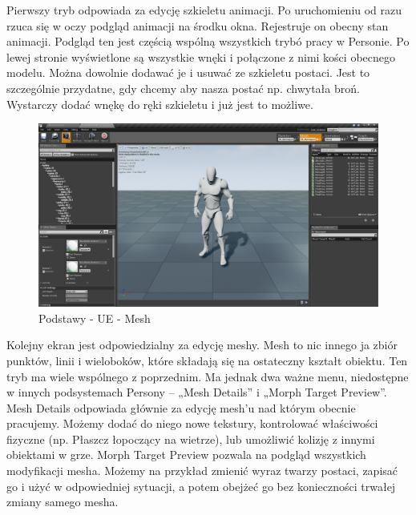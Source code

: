 \documentclass[brudnopis]{xmgr}
\begin{document}
Pierwszy tryb odpowiada za edycję szkieletu animacji. Po uruchomieniu od razu rzuca się w oczy podgląd animacji na środku okna. Rejestruje on obecny stan animacji. Podgląd ten jest częścią wspólną wszystkich trybó pracy w Personie.
Po lewej stronie wyświetlone są wszystkie wnęki i połączone z nimi kości obecnego modelu. Można dowolnie dodawać je i usuwać ze szkieletu postaci. Jest to szczególnie przydatne, gdy chcemy aby nasza postać np. chwytała broń. Wystarczy dodać wnękę do ręki szkieletu i już jest to możliwe.

\begin{figure}[!htb]
    \begin{center}
    \includegraphics[scale=0.25]{Screeny/Mesh}
    \end{center}
    \caption{Podstawy - UE - Mesh}
\end{figure}

Kolejny ekran jest odpowiedzialny za edycję meshy. Mesh to nic innego ja zbiór punktów, linii i wieloboków, które składają się na ostateczny kształt obiektu.
Ten tryb ma wiele wspólnego z poprzednim. Ma jednak dwa ważne menu, niedostępne w innych podsystemach Persony – „Mesh Details” i „Morph Target Preview”.
Mesh Details odpowiada głównie za edycję mesh’u nad którym obecnie pracujemy. Możemy dodać do niego nowe tekstury, kontrolować właściwości fizyczne (np. Płaszcz łopoczący na wietrze), lub umożliwić kolizję z innymi obiektami w grze.
Morph Target Preview pozwala na podgląd wszystkich modyfikacji mesha. Możemy na przykład zmienić wyraz twarzy postaci, zapisać go i użyć w odpowiedniej sytuacji, a potem obejżeć go bez konieczności trwałej zmiany samego mesha.
\end{document}
